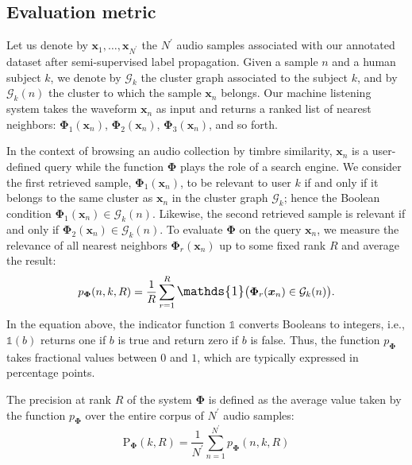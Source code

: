 \documentclass{bmcart}
\begin{document}
\subsection*{Evaluation metric}

Let us denote by $\boldsymbol{x}_1, \ldots, \boldsymbol{x}_{{N}^{\prime}}$ the $N^{\prime}$ audio samples associated with our annotated dataset after semi-supervised label propagation.
Given a sample $n$ and a human subject $k$, we denote by $\mathcal{G}_k$ the cluster graph associated to the subject $k$, and by $\mathcal{G}_k (n)$ the cluster to which the sample $\boldsymbol{x}_{n}$ belongs.
Our machine listening system takes the waveform $\boldsymbol{x}_{n}$ as input and returns a ranked list of nearest neighbors: $\mathbf{\Phi}_1 (\boldsymbol{x}_n)$, $\mathbf{\Phi}_2 (\boldsymbol{x}_n)$, $\mathbf{\Phi}_3 (\boldsymbol{x}_n)$, and so forth.

In the context of browsing an audio collection by timbre similarity, $\boldsymbol{x}_n$ is a user-defined query while the function $\mathbf{\Phi}$ plays the role of a search engine.
We consider the first retrieved sample, $\mathbf{\Phi}_1 (\boldsymbol{x}_n)$, to be relevant to user $k$ if and only if it belongs to the same cluster as $\boldsymbol{x}_n$ in the cluster graph $\mathcal{G}_k$; hence the Boolean condition $\mathbf{\Phi}_{1}(\boldsymbol{x}_{n}) \in \mathcal{G}_k (n)$.
Likewise, the second retrieved sample is relevant if and only if $\mathbf{\Phi}_{2}(\boldsymbol{x}_{n}) \in \mathcal{G}_k (n)$.
To evaluate $\mathbf{\Phi}$ on the query $\boldsymbol{x}_n$, we measure the relevance of all nearest neighbors $\mathbf{\Phi}_r (\boldsymbol{x}_n)$ up to some fixed rank $R$ and average the result:
\begin{equation}
p_{\mathbf{\Phi}}(n, k, R) =
    \dfrac{1}{R}
    \sum_{r=1}^{R}
    \mathlarger{\mathds{1}}
    \big(
        \mathbf{\Phi}_r(\boldsymbol{x}_n)
        \in
        \mathcal{G}_k (n)
    \big).
\end{equation}
In the equation above, the indicator function $\mathds{1}$ converts Booleans to integers, i.e., $\mathds{1}(b)$ returns one if $b$ is true and return zero if $b$ is false.
Thus, the function $p_{\mathbf{\Phi}}$ takes fractional values between $0$ and $1$, which are typically expressed in percentage points.

The precision at rank $R$ of the system $\mathbf{\Phi}$ is defined as the average value taken by the function $p_{\mathbf{\Phi}}$ over the entire corpus of $N^{\prime}$ audio samples:
\begin{equation}
\mathrm{P}_{\mathbf{\Phi}}(k, R) =
\dfrac{1}{N^{\prime}}
\sum_{n=1}^{N^{\prime}}
p_{\mathbf{\Phi}}(n, k, R)
\end{equation}
\end{document}
